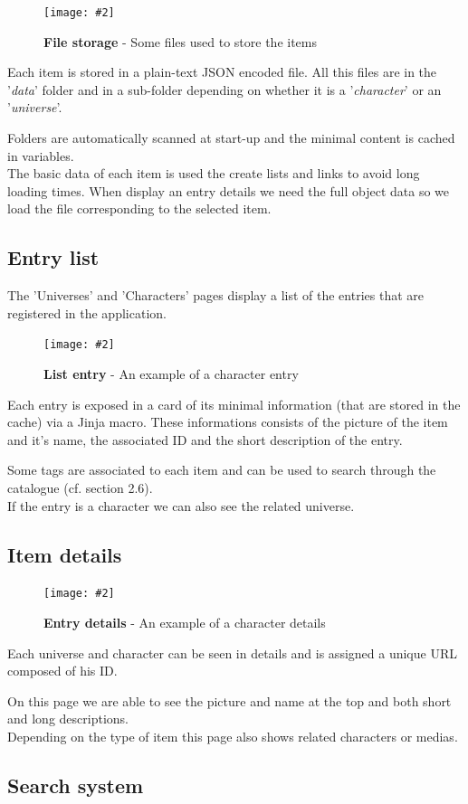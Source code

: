 \documentclass[10pt, a4paper]{article}
\newcommand{\figuremacro}[5]{
    \begin{figure}[#1]
        \centering
        \texttt{[image: \#2]}
        \caption[#3]{\textbf{#3}#4}
        \label{fig:#2}
    \end{figure}
}
\begin{document}
	\figuremacro{h}{JsonFiles}{File storage}{ - Some files used to store the items}{0.15}
	
	Each item is stored in a plain-text JSON encoded file. All this files are in the '\textit{data}' folder and in a sub-folder depending on whether it is a '\textit{character}' or an '\textit{universe}'.
	
	Folders are automatically scanned at start-up and the minimal content is cached in variables. \\
	The basic data of each item is used the create lists and links to avoid long loading times.
	When display an entry details we need the full object data so we load the file corresponding to the selected item.
	
	\subsection{Entry list}
	The 'Universes' and 'Characters' pages display a list of the entries that are registered in the application.
	
	\figuremacro{h}{CharacterEntry}{List entry}{ - An example of a character entry}{0.8}
	
	Each entry is exposed in a card of its minimal information (that are stored in the cache) via a Jinja macro. These informations consists of the picture of the item and it's name, the associated ID and the short description of the entry.
	
	Some tags are associated to each item and can be used to search through the catalogue (cf. section 2.6). \\
	If the entry is a character we can also see the related universe.
	
	\subsection{Item details}
	
	\figuremacro{h}{CharacterDetails}{Entry details}{ - An example of a character details}{0.6}
	
	Each universe and character can be seen in details and is assigned a unique URL composed of his ID.
	
	On this page we are able to see the picture and name at the top and both short and long descriptions.\\
	Depending on the type of item this page also shows related characters or medias.
	
	\subsection{Search system}
	
\end{document}
